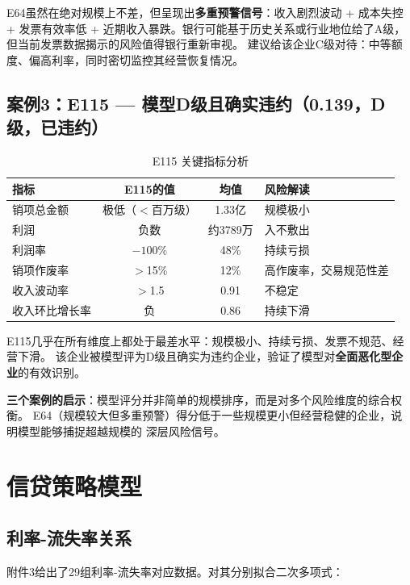 \documentclass[12pt,a4paper]{ctexart}
\begin{document}
E64虽然在绝对规模上不差，但呈现出\textbf{多重预警信号}：收入剧烈波动 + 成本失控 + 发票有效率低 +
近期收入暴跌。银行可能基于历史关系或行业地位给了A级，但当前发票数据揭示的风险值得银行重新审视。
建议给该企业C级对待：中等额度、偏高利率，同时密切监控其经营恢复情况。

\subsection{案例3：E115 — 模型D级且确实违约（0.139，D级，已违约）}

\begin{table}[H]
\centering
\caption{E115 关键指标分析}
\label{tab:case3}
\begin{tabular}{l|c|c|l}
\toprule
\textbf{指标} & \textbf{E115的值} & \textbf{均值} & \textbf{风险解读} \\
\midrule
销项总金额 & 极低（$<$百万级） & 1.33亿 & 规模极小 \\
利润 & 负数 & 约3789万 & 入不敷出 \\
利润率 & $-100\%$ & 48\% & 持续亏损 \\
销项作废率 & $>$15\% & 12\% & 高作废率，交易规范性差 \\
收入波动率 & $>$1.5 & 0.91 & 不稳定 \\
收入环比增长率 & 负 & 0.86 & 持续下滑 \\
\bottomrule
\end{tabular}
\end{table}

E115几乎在所有维度上都处于最差水平：规模极小、持续亏损、发票不规范、经营下滑。
该企业被模型评为D级且确实为违约企业，验证了模型对\textbf{全面恶化型企业}的有效识别。

\textbf{三个案例的启示}：模型评分并非简单的规模排序，而是对多个风险维度的综合权衡。
E64（规模较大但多重预警）得分低于一些规模更小但经营稳健的企业，说明模型能够捕捉超越规模的
深层风险信号。

\section{信贷策略模型}

\subsection{利率-流失率关系}

附件3给出了29组利率-流失率对应数据。对其分别拟合二次多项式：
\end{document}
